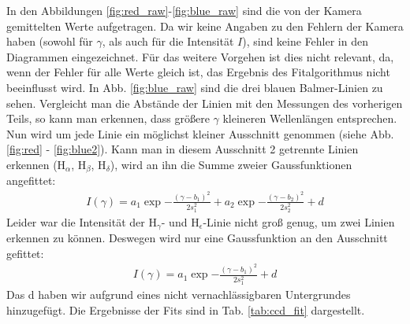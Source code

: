 In den Abbildungen \ref{fig:red_raw}-\ref{fig:blue_raw} sind die von der Kamera gemittelten Werte aufgetragen. Da wir keine Angaben zu den Fehlern der Kamera haben (sowohl für $\gamma$, als auch für die Intensität $I$), sind keine Fehler in den Diagrammen eingezeichnet. Für das weitere Vorgehen ist dies nicht relevant, da, wenn der Fehler für alle Werte gleich ist, das Ergebnis des Fitalgorithmus nicht beeinflusst wird. In Abb. \ref{fig:blue_raw} sind die drei blauen Balmer-Linien zu sehen. Vergleicht man die Abstände der Linien mit den Messungen des vorherigen Teils, so kann man erkennen, dass größere $\gamma$ kleineren Wellenlängen entsprechen.\\

Nun wird um jede Linie ein möglichst kleiner Ausschnitt genommen (siehe Abb. \ref{fig:red} - \ref{fig:blue2}). Kann man in diesem Ausschnitt 2 getrennte Linien erkennen (H$_\alpha$, H$_\beta$, H$_\delta$), wird an ihn die Summe zweier Gaussfunktionen angefittet:
\begin{align*}
I(\gamma) = a_1\exp{-\frac{(\gamma-b_1)^2}{2s_1^2}} + a_2\exp{-\frac{(\gamma-b_2)^2}{2s_2^2}} + d
\end{align*}
Leider war die Intensität der H$_\gamma$- und H$_\epsilon$-Linie nicht groß genug, um zwei Linien erkennen zu können. Deswegen wird nur eine Gaussfunktion an den Ausschnitt gefittet:
\begin{align*}
I(\gamma) = a_1\exp{-\frac{(\gamma-b_1)^2}{2s_1^2}} + d
\end{align*}
Das d haben wir aufgrund eines nicht vernachlässigbaren Untergrundes hinzugefügt. Die Ergebnisse der Fits sind in Tab. \ref{tab:ccd_fit} dargestellt.

